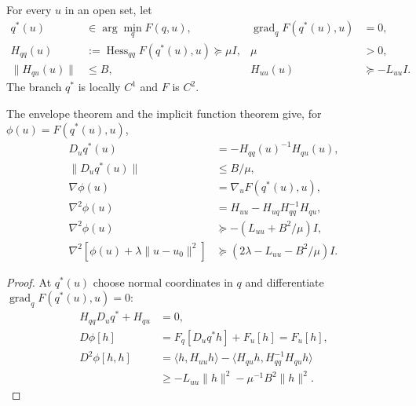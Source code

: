 \begin{assumption}
For every $u$ in an open set, let
\begin{align}
 q^*(u)&\in\arg\min_qF(q,u),&
 \operatorname{grad}_qF(q^*(u),u)&=0,\\
 H_{qq}(u)&:=\operatorname{Hess}_{qq}F(q^*(u),u)\succeq\mu I,&\mu&>0,\\
 \|H_{qu}(u)\|&\le B,&H_{uu}(u)&\succeq-L_{uu}I.
\end{align}
The branch $q^*$ is locally $C^1$ and $F$ is $C^2$.
\end{assumption}
\begin{proposition}
\label{prop:rigid-profile}
The envelope theorem \citep{milgrom2002envelope} and the implicit function theorem give, for $\phi(u)=F(q^*(u),u)$,
\begin{align}
 D_uq^*(u)&=-H_{qq}(u)^{-1}H_{qu}(u),\\
 \|D_uq^*(u)\|&\le B/\mu,\\
 \nabla\phi(u)&=\nabla_uF(q^*(u),u),\\
 \nabla^2\phi(u)&=H_{uu}-H_{uq}H_{qq}^{-1}H_{qu},\\
 \nabla^2\phi(u)&\succeq-(L_{uu}+B^2/\mu)I,\\
 \nabla^2[\phi(u)+\lambda\|u-u_0\|^2]
 &\succeq(2\lambda-L_{uu}-B^2/\mu)I.
\end{align}
\end{proposition}
\begin{proof}
At $q^*(u)$ choose normal coordinates in $q$ and differentiate
$\operatorname{grad}_qF(q^*(u),u)=0$:
\begin{align}
 H_{qq}D_uq^*+H_{qu}&=0,\\
 D\phi[h]&=F_q[D_uq^*h]+F_u[h]=F_u[h],\\
 D^2\phi[h,h]
 &=\langle h,H_{uu}h\rangle-
 \langle H_{qu}h,H_{qq}^{-1}H_{qu}h\rangle\\
 &\ge-L_{uu}\|h\|^2-\mu^{-1}B^2\|h\|^2.
\end{align}
\end{proof}

